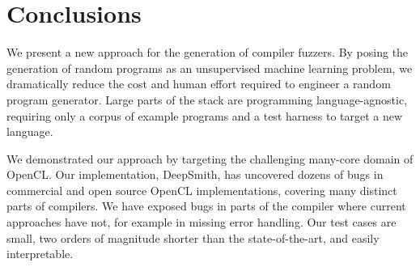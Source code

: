 \section{Conclusions}\label{sec:conclusion}

We present a new approach for the generation of compiler fuzzers. By posing the generation of random programs as an unsupervised machine learning problem, we dramatically reduce the cost and human effort required to engineer a random program generator. Large parts of the stack are programming language-agnostic, requiring only a corpus of example programs and a test harness to target a new language.

We demonstrated our approach by targeting the challenging many-core domain of OpenCL. Our implementation, DeepSmith, has uncovered dozens of bugs in commercial and open source OpenCL implementations, covering many distinct parts of compilers. We have exposed bugs in parts of the compiler where current approaches have not, for example in missing error handling. Our test cases are small, two orders of magnitude shorter than the state-of-the-art, and easily interpretable. 


